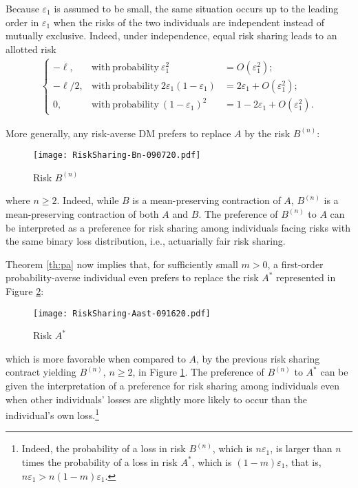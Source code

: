 \documentclass[11pt]{article}
\begin{document}
Because $\varepsilon_{1}$ is assumed to be small, the same situation occurs up to the leading order in $\varepsilon_{1}$
when the risks of the two individuals are independent instead of mutually exclusive.
Indeed, under independence, equal risk sharing leads to an allotted risk
\begin{align*}
\left\{
  \begin{array}{lll}
    -\ell, & \mathrm{with\ probability}\ \varepsilon_{1}^{2}&=O(\varepsilon_{1}^{2});\\
    -\ell/2, & \mathrm{with\ probability}\ 2\varepsilon_{1}(1-\varepsilon_{1})&=2\varepsilon_{1}+O(\varepsilon_{1}^{2});\\
    0, & \mathrm{with\ probability}\ (1-\varepsilon_{1})^{2}&=1-2\varepsilon_{1}+O(\varepsilon_{1}^{2}).
  \end{array}
\right.
\end{align*}

More generally, any risk-averse DM prefers to replace $A$ by the risk $B^{(n)}$:
\vskip -0.5cm
\begin{figure}[H]
\begin{center}
\caption{Risk $B^{(n)}$
}
\vskip 0.4cm
\texttt{[image: RiskSharing-Bn-090720.pdf]}
\label{fig:Bn}
\end{center}
\end{figure}
\noindent where $n\geq 2$.
Indeed, while $B$ is a mean-preserving contraction of $A$, $B^{(n)}$ is a mean-preserving contraction of both $A$ and $B$.
The preference of $B^{(n)}$ to $A$ can be interpreted as a preference for risk sharing among individuals facing risks with the same binary loss distribution,
i.e., actuarially fair risk sharing.

Theorem \ref{th:pa} now implies that, for sufficiently small $m>0$,
a first-order probability-averse individual
even prefers to replace the risk $A^{\ast}$ represented in Figure \ref{fig:Aast}:
\vskip -0.5cm
\begin{figure}[H]
\begin{center}
\caption{Risk $A^{\ast}$
}
\vskip 0.4cm
\texttt{[image: RiskSharing-Aast-091620.pdf]}
\label{fig:Aast}
\end{center}
\end{figure}
\noindent
which is more favorable when compared to $A$,
by the previous risk sharing contract yielding $B^{(n)}$, $n\geq 2$, in Figure \ref{fig:Bn}. 
The preference of $B^{(n)}$ to $A^{\ast}$
can be given the interpretation of a preference for risk sharing among individuals
even when other individuals' losses are slightly more likely to occur
than the individual's own loss.\footnote{Indeed, the probability of a loss in risk $B^{(n)}$, which is $n\varepsilon_{1}$,
is larger than $n$ times the probability of a loss in risk $A^{\ast}$, which is $\left(1-m\right)\varepsilon_{1}$, that is,
$n\varepsilon_{1}>n\left(1-m\right)\varepsilon_{1}$.}
\end{document}
